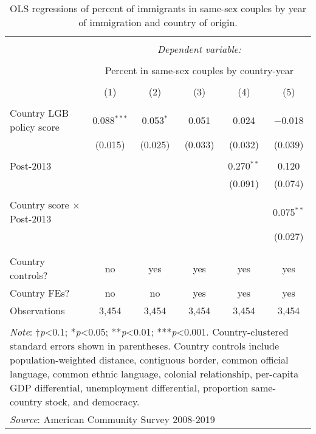 \documentclass[
  12pt,
]{article}
\begin{document}
\begin{table}[!htbp] \centering 
  \caption{OLS regressions of percent of immigrants in same-sex couples by year of immigration and country of origin.} 
  \label{tab:country-props} 
\begin{tabular}{@{\extracolsep{5pt}}lccccc} 
\\[-1.8ex]\hline 
\hline \\[-1.8ex] 
 & \multicolumn{5}{c}{\textit{Dependent variable:}} \\ 
\cline{2-6} 
\\[-1.8ex] & \multicolumn{5}{c}{Percent in same-sex couples by country-year} \\ 
\\[-1.8ex] & (1) & (2) & (3) & (4) & (5)\\ 
\hline \\[-1.8ex] 
 Country LGB policy score & 0.088$^{***}$ & 0.053$^{*}$ & 0.051 & 0.024 & $-$0.018 \\ 
  & (0.015) & (0.025) & (0.033) & (0.032) & (0.039) \\ 
  & & & & & \\ 
 Post-2013 &  &  &  & 0.270$^{**}$ & 0.120 \\ 
  &  &  &  & (0.091) & (0.074) \\ 
  & & & & & \\ 
 Country score × Post-2013 &  &  &  &  & 0.075$^{**}$ \\ 
  &  &  &  &  & (0.027) \\ 
  & & & & & \\ 
\hline \\[-1.8ex] 
Country controls? & no & yes & yes & yes & yes \\ 
Country FEs? & no & no & yes & yes & yes \\ 
Observations & 3,454 & 3,454 & 3,454 & 3,454 & 3,454 \\ 
\hline 
\hline \\[-1.8ex] 
\multicolumn{6}{l}{\parbox[t]{.8\textwidth}{\textit{Note}: †\textit{p}<0.1; *\textit{p}<0.05; **\textit{p}<0.01; ***\textit{p}<0.001. Country-clustered standard errors shown in parentheses. Country controls include population-weighted distance, contiguous border, common official language, common ethnic language, colonial relationship, per-capita GDP differential, unemployment differential, proportion same-country stock, and democracy.}} \\ 
\multicolumn{6}{l}{\textit{Source}: American Community Survey 2008-2019} \\ 
\end{tabular} 
\end{table}
\end{document}
